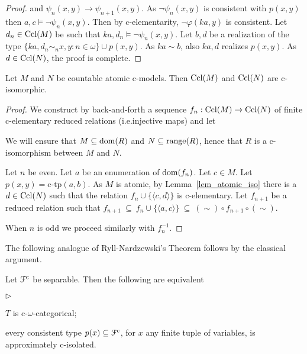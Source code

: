 \documentclass{amsproc}
\newcommand{\mylabel}[1]{{#1}\hfill}
\renewenvironment{itemize}
  {\begin{list}{$\triangleright$}{%
  \setlength{\parskip}{0mm}
  \setlength{\topsep}{.4\baselineskip}
  \setlength{\rightmargin}{0mm}
  \setlength{\listparindent}{0mm}
  \setlength{\itemindent}{0mm}
  \setlength{\labelwidth}{3ex}
  \setlength{\itemsep}{.2\baselineskip}
  \setlength{\parsep}{.2\baselineskip}
  \setlength{\partopsep}{0mm}
  \setlength{\labelsep}{1ex}
  \setlength{\leftmargin}{\labelwidth+\labelsep}
  \let\makelabel\mylabel}}{%
\end{list}}
\begin{document}
{\begin{proof}
  
  and $\psi_n(x,y)\rightarrow\psi_{n+1}(x,y)$.
  As $\neg\psi_n(x,y)$ is consistent with $p(x,y)$ then $a,c\models\neg\psi_n(x,y)$.
  Then by c-elementarity, $\neg\varphi(ka,y)$ is consistent.
  Let $d_n\in{\rm Ccl}(M)$ be such that $ka,d_n\models\neg\psi_n(x,y)$.
  Let $b,d$ be a realization of the type $\{ka,d_n\sim_nx,y:n\in\omega\}\cup p(x,y)$.
  As $ka\sim b$, also $ka,d$ realizes $p(x,y)$.
  As $d\in{\rm Ccl}(N)$, the proof is complete.
\end{proof}

\begin{fact}\label{fact_atomic_iso}
  Let $M$ and $N$ be countable atomic c-models.
  Then ${\rm Ccl}(M)$ and ${\rm Ccl}(N)$ are c-isomorphic.
\end{fact}

\begin{proof}
  We construct by back-and-forth a sequence $f_n:{\rm Ccl}(M)\rightarrow{\rm Ccl}(N)$ of finite c-elementary reduced relations (i.e.\@ injective maps) and let 
  

  We will ensure that $M\subseteq{\rm dom}(R)$ and $N\subseteq{\rm range}(R)$, hence that $R$ is a c-isomorphism between $M$ and $N$.

  Let $n$ be even.
  Let $a$ be an enumeration of ${\rm dom}(f_n)$.
  Let $c\in M$.
  Let $p(x,y)=\mbox{c-tp}(a,b)$.
  As $M$ is atomic, by Lemma~\ref{lem_atomic_iso} there is a $d\in{\rm Ccl}(N)$ such that the relation $f_n\cup\{\langle c,d\rangle\}$ is c-elementary.
  Let $f_{n+1}$ be a reduced relation such that $f_{n+1}\ \subseteq\ f_n\cup\{\langle a,c\rangle\}\ \subseteq\ (\sim)\circ f_{n+1}\circ(\sim)$.

  When $n$ is odd we proceed similarly with $f_n^{-1}$.
\end{proof}

The following analogue of Ryll-Nardzewski's Theorem follows by the classical argument.

\begin{theorem}
  Let ${\EuScript F}^{\rm c}$ be separable.
  Then the following are equivalent
  \begin{itemize}
    \item[1.] $T$ is c-$\omega$-categorical;
    \item[2.] every consistent type $p(x)\subseteq{\EuScript F}^{\rm c}$, for $x$ any finite tuple of variables, is approximately c-isolated.
  \end{itemize}
\end{theorem}

}
\end{document}
